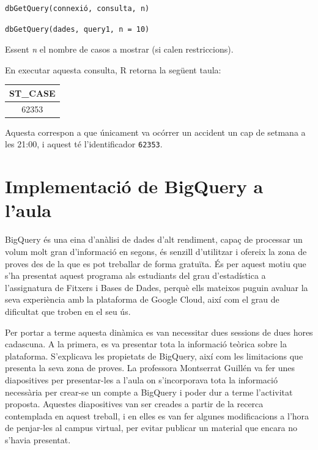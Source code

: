 \documentclass[12pt,longbibliography]{article}
\theoremstyle{definition}
\theoremstyle{remark}
\begin{document}
\begin{multicols}{2}

\begin{verbatim}
dbGetQuery(connexió, consulta, n)
\end{verbatim}

\columnbreak

\begin{verbatim}
dbGetQuery(dades, query1, n = 10)
\end{verbatim}

\end{multicols}

Essent \emph{n} el nombre de casos a mostrar (si calen restriccions).


En executar aquesta consulta, R retorna la següent taula:

\begin{table}[h]
\centering
\begin{tabular}{|c|}
\hline
\textbf{ST\_CASE} \\ \hline
62353             \\ \hline
\end{tabular}
\end{table}

Aquesta correspon a que únicament va ocórrer un accident un cap de setmana a les 21:00, i aquest té l'identificador \texttt{62353}.

\newpage

\section{Implementació de BigQuery a l'aula}

BigQuery és una eina d'anàlisi de dades d'alt rendiment, capaç de processar un volum molt gran d'informació en segons, és senzill d'utilitzar i ofereix la zona de proves des de la que es pot treballar de forma gratuïta. És per aquest motiu que s'ha presentat aquest programa als estudiants del grau d'estadística a l'assignatura de Fitxers i Bases de Dades, perquè ells mateixos puguin avaluar la seva experiència amb la plataforma de Google Cloud, així com el grau de dificultat que troben en el seu ús.

Per portar a terme aquesta dinàmica es van necessitar dues sessions de dues hores cadascuna. A la primera, es va presentar tota la informació teòrica sobre la plataforma. S'explicava les propietats de BigQuery, així com les limitacions que presenta la seva zona de proves. La professora Montserrat Guillén va fer unes diapositives per presentar-les a l'aula on s'incorporava tota la informació necessària per crear-se un compte a BigQuery i poder dur a terme l'activitat proposta. Aquestes diapositives van ser creades a partir de la recerca contemplada en aquest treball, i en elles es van fer algunes modificacions a l'hora de penjar-les al campus virtual, per evitar publicar un material que encara no s'havia presentat.
\end{document}
